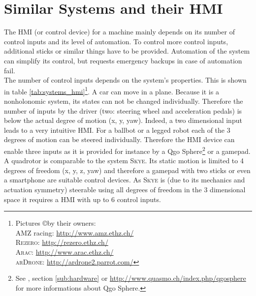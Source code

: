 \section{Similar Systems and their HMI}
\label{sec:similar systems}
The HMI (or control device) for a machine mainly depends on its number of control inputs and its level of automation. To control more control inputs, additional sticks or similar things have to be provided. Automation of the system can simplify its control, but requests emergency backups in case of automation fail. \\
The number of control inputs depends on the system's properties. This is shown in table \ref{tab:systems_hmi}\footnote{Pictures \copyright by their owners: \\ \textsc{AMZ} racing: \url{http://www.amz.ethz.ch/} \\ \textsc{Rezero}: \url{http://rezero.ethz.ch/} \\ \textsc{Arac}: \url{http://www.arac.ethz.ch/} \\ \textsc{arDrone}: \url{http://ardrone2.parrot.com/}}. A car can move in a plane. Because it is a nonholonomic system, its states can not be changed individually. Therefore the number of inputs by the driver (two: steering wheel and acceleration pedals) is below the actual degree of motion (x, y, yaw). Indeed, a two dimensional input leads to a very intuitive HMI.
For a ballbot or a legged robot each of the 3 degrees of motion can be steered individually. Therefore the HMI device can enable three inputs as it is provided for instance by a Qgo Sphere\footnote{See \cite{kammermann}, section \ref{sub:hardware} or \url{http://www.quasmo.ch/index.php/qgosphere} for more informations about Qgo Sphere.} or a gamepad. A quadrotor is comparable to the system \textsc{Skye}. Its static motion is limited to 4 degrees of freedom (x, y, z, yaw) and therefore a gamepad with two sticks or even a smartphone are suitable control devices. As \textsc{Skye} is (due to its mechanics and actuation symmetry) steerable using all degrees of freedom in the 3 dimensional space it requires a HMI with up to 6 control inputs.

